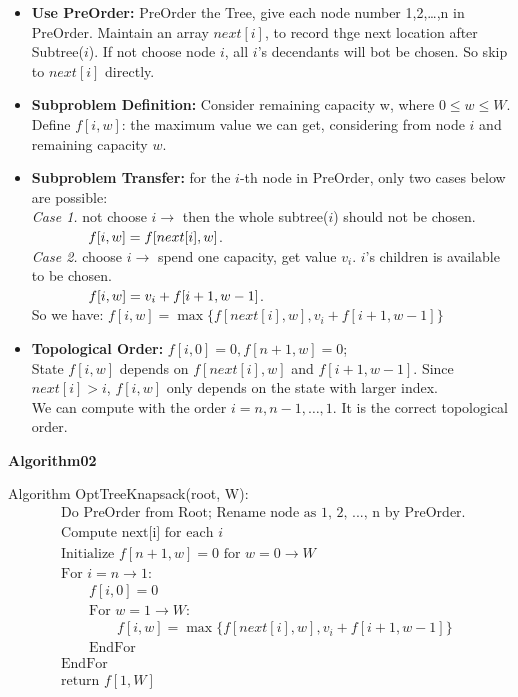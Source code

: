 \documentclass[11pt]{article}
\begin{document}
\begin{itemize}
    \item \textbf{Use PreOrder:} PreOrder the Tree, give each node number {1,2,\dots,n} in PreOrder. 
    Maintain an array $next[i]$, to record thge next location after Subtree($i$). If not choose node $i$, all $i$'s decendants will bot be chosen. 
    So skip to $next[i]$ directly. 
    \item \textbf{Subproblem Definition:} Consider remaining capacity w, where $0 \le w \le W$. \\
    Define $f[i, w]$: the maximum value we can get, considering from node $i$ and remaining capacity $w$. 
    \item \textbf{Subproblem Transfer:} for the $i$-th node in PreOrder, only two cases below are possible: \\
    \textit{Case 1. } not choose $i \to$ then the whole subtree($i$) should not be chosen. \\
    $ \text{\qquad \qquad } f[i, w] = f[next[i], w]$. \\
    \textit{Case 2. } choose $i \to$ spend one capacity, get value $v_i$. $i$'s children is available to be chosen. \\
    $ \text{\qquad \qquad } f[i, w] = v_i + f[i +1, w - 1]$. \\
    So we have: $f[i, w]=\max \{f[next[i], w], v_i + f[i+1, w-1]\}$
    \item \textbf{Topological Order:} $f[i, 0] = 0, f[n+1, w] = 0$; \\
    State $f[i, w]$ depends on $f[next[i], w]$ and $f[i+1, w-1]$. Since $next[i] > i$, $f[i, w]$ only depends on the state 
    with larger index. \\
    We can compute with the order $i = n, n-1, \dots, 1$. It is the correct topological order.
\end{itemize}

\textbf{Algorithm02}

Algorithm OptTreeKnapsack(root, W): 
\begin{align*}
    & \text{Do PreOrder from Root; Rename node as 1, 2, ..., n by PreOrder. } \\
    & \text{Compute next[i] for each } i \\
    & \text{Initialize } f[n+1,w] = 0 \text{ for }w = 0 \to W \\
    & \text{For } i = n \to 1: \\
    & \qquad f[i, 0] = 0 \\
    & \qquad \text{For } w = 1 \to W: \\
    & \qquad \qquad f[i, w] = \max \{f[next[i], w], v_i + f[i+1, w-1]\} \\
    & \qquad \text{EndFor} \\
    & \text{EndFor} \\
    & \text{return } f[1, W]
\end{align*}
\end{document}
